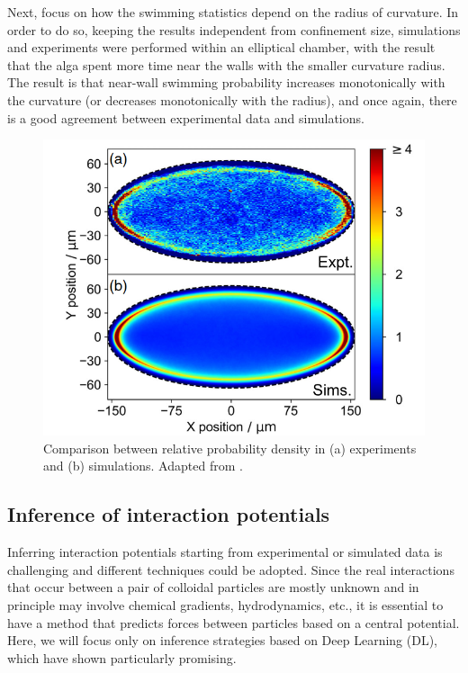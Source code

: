 \documentclass[../../master_thesis_np.tex]{subfiles}
\begin{document}
	Next, \citeauthor{ostapenko_curvature-guided_2018} focus on how the swimming statistics depend on the radius of curvature. 
	In order to do so, keeping the results independent from confinement size, simulations and experiments were performed within an elliptical chamber, with the result that the alga spent more time near the walls with the smaller curvature radius. 
	The result is that near-wall swimming probability increases monotonically with the curvature (or decreases monotonically with the radius), and once again, there is a good agreement between experimental data and simulations.
	\begin{figure}[htp]
		\centering
		\includegraphics[width=\singfigwidth]{ostapenko2.png}
		\caption{Comparison between relative probability density in (a) experiments and (b) simulations. Adapted from \cite{ostapenko_curvature-guided_2018}.}
		\label{fig:ostapenko2}
	\end{figure}
	
	\subsection{Inference of interaction potentials}
	Inferring interaction potentials starting from experimental or simulated data is challenging and different techniques could be adopted. 
	Since the real interactions that occur between a pair of colloidal particles are mostly unknown and in principle may involve chemical gradients, hydrodynamics, etc., it is essential to have a method that predicts forces between particles based on a central potential. 
	Here, we will focus only on inference strategies based on Deep Learning (DL), which have shown particularly promising. 
	
\end{document}
